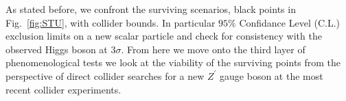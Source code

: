 As stated before, we confront the surviving scenarios, black points in Fig.~\ref{fig:STU}, with collider bounds. In particular $95\%$ Confidance Level (C.L.) exclusion limits on a new scalar particle and check for consistency with the observed Higgs boson at $3 \sigma$. 
%
%
%
%
From here we move onto the third layer of phenomenological tests we look at the viability of the surviving points from the perspective of direct collider searches for a new $Z^\prime$ gauge boson at the most recent collider experiments.
%
%
